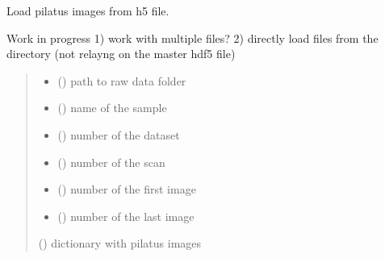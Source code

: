 \documentclass[letterpaper,10pt,english]{sphinxmanual}
\begin{document}
\begin{fulllineitems}
\label{\detokenize{index:ID10_tools.load_pilatus}}
\pysigstartsignatures
\pysiglinewithargsret
{}
{\sphinxparamcomma {}\sphinxparamcomma {}\sphinxparamcomma {}\sphinxparamcomma {}\sphinxparamcomma {}\sphinxparamcomma {}}
{}
\pysigstopsignatures
\sphinxAtStartPar
Load pilatus images from h5 file.

\sphinxAtStartPar
Work in progress
1) work with multiple files?
2) directly load files from the directory (not relayng on the master hdf5 file)
\begin{quote}\begin{description}
\begin{itemize}
\item {} 
\sphinxAtStartPar
{} () \textendash{} path to raw data folder

\item {} 
\sphinxAtStartPar
{} () \textendash{} name of the sample

\item {} 
\sphinxAtStartPar
{} () \textendash{} number of the dataset

\item {} 
\sphinxAtStartPar
{} () \textendash{} number of the scan

\item {} 
\sphinxAtStartPar
{} () \textendash{} number of the first image

\item {} 
\sphinxAtStartPar
{} () \textendash{} number of the last image

\end{itemize}

\sphinxAtStartPar
{} () \textendash{} dictionary with pilatus images

\end{description}\end{quote}

\end{fulllineitems}
\end{document}
